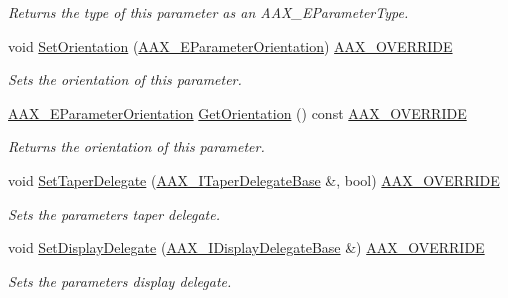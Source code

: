 \begin{DoxyCompactItemize}
\begin{DoxyCompactList}\small\item\em Returns the type of this parameter as an A\+A\+X\+\_\+\+E\+Parameter\+Type. \end{DoxyCompactList}\item 
void \mbox{\hyperlink{a01541_afa70e0faba000d1b6a241dfef7fd528c}{Set\+Orientation}} (\mbox{\hyperlink{a00491_a52f91d1c14aa5dceedabfb9d2de31bf0}{A\+A\+X\+\_\+\+E\+Parameter\+Orientation}}) \mbox{\hyperlink{a00392_ac2f24a5172689ae684344abdcce55463}{A\+A\+X\+\_\+\+O\+V\+E\+R\+R\+I\+DE}}
\begin{DoxyCompactList}\small\item\em Sets the orientation of this parameter. \end{DoxyCompactList}\item 
\mbox{\hyperlink{a00491_a52f91d1c14aa5dceedabfb9d2de31bf0}{A\+A\+X\+\_\+\+E\+Parameter\+Orientation}} \mbox{\hyperlink{a01541_a76283186d4844b0b9e6f37168415c93a}{Get\+Orientation}} () const \mbox{\hyperlink{a00392_ac2f24a5172689ae684344abdcce55463}{A\+A\+X\+\_\+\+O\+V\+E\+R\+R\+I\+DE}}
\begin{DoxyCompactList}\small\item\em Returns the orientation of this parameter. \end{DoxyCompactList}\item 
void \mbox{\hyperlink{a01541_a275c75b502a0635bb119804a662d56c4}{Set\+Taper\+Delegate}} (\mbox{\hyperlink{a01877}{A\+A\+X\+\_\+\+I\+Taper\+Delegate\+Base}} \&, bool) \mbox{\hyperlink{a00392_ac2f24a5172689ae684344abdcce55463}{A\+A\+X\+\_\+\+O\+V\+E\+R\+R\+I\+DE}}
\begin{DoxyCompactList}\small\item\em Sets the parameter\textquotesingle{}s taper delegate. \end{DoxyCompactList}\item 
void \mbox{\hyperlink{a01541_a6d95b6d343041491d85e4d466fc4b049}{Set\+Display\+Delegate}} (\mbox{\hyperlink{a01797}{A\+A\+X\+\_\+\+I\+Display\+Delegate\+Base}} \&) \mbox{\hyperlink{a00392_ac2f24a5172689ae684344abdcce55463}{A\+A\+X\+\_\+\+O\+V\+E\+R\+R\+I\+DE}}
\begin{DoxyCompactList}\small\item\em Sets the parameter\textquotesingle{}s display delegate. \end{DoxyCompactList}\end{DoxyCompactItemize}
